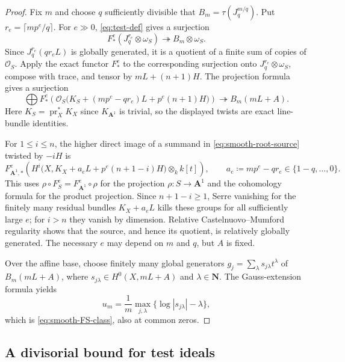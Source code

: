 \documentclass[11pt,a4paper]{article}
\begin{document}
\begin{proof}
Fix $m$ and choose $q$ sufficiently divisible that $B_m=\tau(J_q^{m/q})$.  Put $r_e=\lceil mp^e/q\rceil$. For $e\gg0$, \eqref{eq:test-def} gives a surjection
\[
 F_*^e(J_q^{r_e}\otimes\omega_S)
       \twoheadrightarrow B_m\otimes\omega_S.
\]
Since $J_q^{r_e}(qr_eL)$ is globally generated, it is a quotient of a finite sum of copies of $\mathcal O_S$.  Apply the exact functor $F_*^e$ to the corresponding surjection onto $J_q^{r_e}\otimes\omega_S$, compose with trace, and tensor by $mL+(n+1)H$.  The projection formula gives a surjection
\begin{equation}\label{eq:smooth-root-source}
 \bigoplus F_*^e\!\left(\mathcal O_S
 \bigl(K_S+(mp^e-qr_e)L+p^e(n+1)H\bigr)\right)
 \twoheadrightarrow B_m(mL+A).
\end{equation}
Here $K_S=\operatorname{pr}_X^*K_X$ since $K_{\mathbf A^1}$ is trivial, so the displayed twists are exact line-bundle identities.

For $1\leq i\leq n$, the higher direct image of a summand in \eqref{eq:smooth-root-source} twisted by $-iH$ is
\[
 F_{\mathbf A^1,*}^e
 \left(H^i\bigl(X,K_X+a_eL+p^e(n+1-i)H\bigr)\otimes_k k[t]\right),
 \qquad
 a_e\coloneqq mp^e-qr_e\in\{1-q,\ldots,0\}.
\]
This uses $\rho\circ F_S^e=F_{\mathbf A^1}^e\circ\rho$ for the projection $\rho\colon S\to\mathbf A^1$ and the cohomology formula for the product projection.  Since $n+1-i\geq1$, Serre vanishing \cite[Chapter~III, Theorem~5.2]{Hartshorne} for the finitely many residual bundles $K_X+a_eL$ kills these groups for all sufficiently large $e$; for $i>n$ they vanish by dimension.  Relative Castelnuovo--Mumford regularity \cite[Example~1.8.24]{LazarsfeldI} shows that the source, and hence its quotient, is relatively globally generated.  The necessary $e$ may depend on $m$ and $q$, but $A$ is fixed.

Over the affine base, choose finitely many global generators $g_j=\sum_\lambda s_{j\lambda}t^\lambda$ of $B_m(mL+A)$, where $s_{j\lambda}\in H^0(X,mL+A)$ and $\lambda\in\mathbf N$. The Gauss-extension formula yields
\[
 u_m=\frac1m\max_{j,\lambda}
             \{\log|s_{j\lambda}|-\lambda\},
\]
which is \eqref{eq:smooth-FS-class}, also at common zeros.
\end{proof}

\subsection*{A divisorial bound for test ideals}
\end{document}
